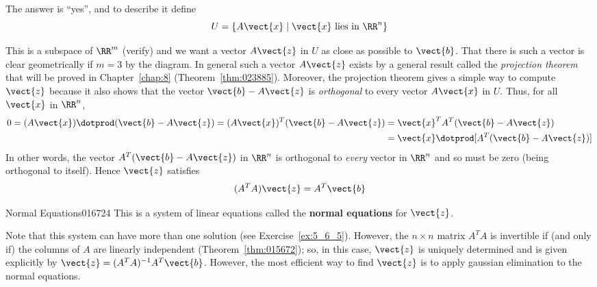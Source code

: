 The answer is ``yes'', and to describe it define
\begin{equation*}
U = \{A\vect{x} \mid \vect{x} \mbox{ lies in } \RR^n \}
\end{equation*}
\begin{wrapfigure}[10]{l}{5cm} 
\centering

\end{wrapfigure}
This is a subspace of $\RR^m$ (verify) and we want a vector $A\vect{z}$ in $U$ as close as possible to $\vect{b}$. That there is such a vector is clear geometrically if $m = 3$ by the diagram. In general such a vector $A\vect{z}$ exists by a general result called the \textit{projection theorem} that will be proved in Chapter~\ref{chap:8} (Theorem~\ref{thm:023885}). Moreover, the projection theorem gives a simple way to compute $\vect{z}$ because it also shows that the vector $\vect{b} - A\vect{z}$ is \textit{orthogonal} to every vector $A\vect{x}$ in $U$. Thus, for all $\vect{x}$ in $\RR^n$,
\begin{align*}
0 = (A\vect{x}) \dotprod (\vect{b} - A\vect{z}) = (A\vect{x})^T(\vect{b} - A\vect{z}) &= \vect{x}^TA^T(\vect{b} - A\vect{z}) \\
&= \vect{x} \dotprod [A^T(\vect{b} - A\vect{z})]
\end{align*}
In other words, the vector $A^{T}(\vect{b} - A\vect{z})$ in $\RR^n$ is orthogonal to \textit{every} vector in $\RR^n$ and so must be zero (being orthogonal to itself). Hence $\vect{z}$ satisfies
\begin{equation*}
(A^TA)\vect{z} = A^T\vect{b}
\end{equation*}

\begin{definition}{Normal Equations}{016724} %
This is a system of linear equations called the \textbf{normal equations} for $\vect{z}$.
\end{definition}
\noindent Note that this system can have more than one solution (see Exercise~\ref{ex:5_6_5}). However, the $n \times n$ matrix $A^{T}A$ is invertible if (and only if) the columns of $A$ are linearly independent (Theorem~\ref{thm:015672}); so, in this case, $\vect{z}$ is uniquely determined and is given explicitly by $\vect{z} = (A^{T}A)^{-1}A^{T}\vect{b}$. However, the most efficient way to find $\vect{z}$ is to apply gaussian elimination to the normal equations.


